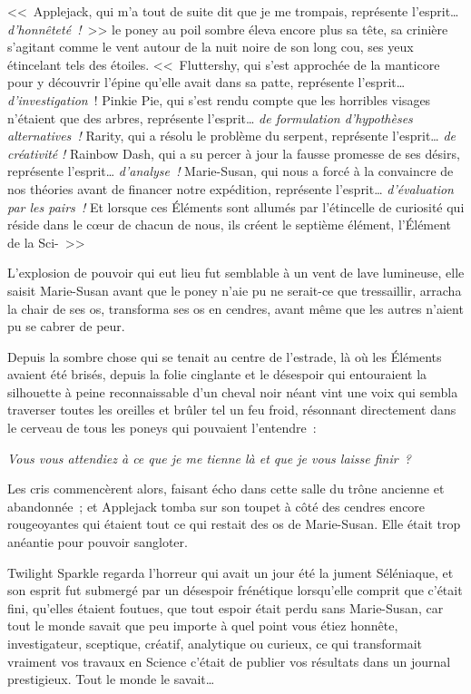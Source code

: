 <<~Applejack, qui m'a tout de suite dit que je me trompais, représente l'esprit… \emph{d'honnêteté~!}~>> le poney au poil sombre éleva encore plus sa tête, sa crinière s'agitant comme le vent autour de la nuit noire de son long cou, ses yeux étincelant tels des étoiles. <<~Fluttershy, qui s'est approchée de la manticore pour y découvrir l'épine qu'elle avait dans sa patte, représente l'esprit… \emph{d'investigation}~! Pinkie Pie, qui s'est rendu compte que les horribles visages n'étaient que des arbres, représente l'esprit… \emph{de formulation d'hypothèses alternatives~!} Rarity, qui a résolu le problème du serpent, représente l'esprit… \emph{de créativité} \emph{!} Rainbow Dash, qui a su percer à jour la fausse promesse de ses désirs, représente l'esprit… \emph{d'analyse~!} Marie-Susan, qui nous a forcé à la convaincre de nos théories avant de financer notre expédition, représente l'esprit… \emph{d'évaluation par les pairs~!} Et lorsque ces Éléments sont allumés par l'étincelle de curiosité qui réside dans le cœur de chacun de nous, ils créent le septième élément, l'Élément de la Sci-~>>

L'explosion de pouvoir qui eut lieu fut semblable à un vent de lave lumineuse, elle saisit Marie-Susan avant que le poney n'aie pu ne serait-ce que tressaillir, arracha la chair de ses os, transforma ses os en cendres, avant même que les autres n'aient pu se cabrer de peur.

Depuis la sombre chose qui se tenait au centre de l'estrade, là où les Éléments avaient été brisés, depuis la folie cinglante et le désespoir qui entouraient la silhouette à peine reconnaissable d'un cheval noir néant vint une voix qui sembla traverser toutes les oreilles et brûler tel un feu froid, résonnant directement dans le cerveau de tous les poneys qui pouvaient l'entendre~:

\emph{Vous vous attendiez à ce que je me tienne là et que je vous laisse finir~?}

Les cris commencèrent alors, faisant écho dans cette salle du trône ancienne et abandonnée~; et Applejack tomba sur son toupet à côté des cendres encore rougeoyantes qui étaient tout ce qui restait des os de Marie-Susan. Elle était trop anéantie pour pouvoir sangloter.

Twilight Sparkle regarda l'horreur qui avait un jour été la jument Séléniaque, et son esprit fut submergé par un désespoir frénétique lorsqu'elle comprit que c'était fini, qu'elles étaient foutues, que tout espoir était perdu sans Marie-Susan, car tout le monde savait que peu importe à quel point vous étiez honnête, investigateur, sceptique, créatif, analytique ou curieux, ce qui transformait vraiment vos travaux en Science c'était de publier vos résultats dans un journal prestigieux. Tout le monde le savait…

